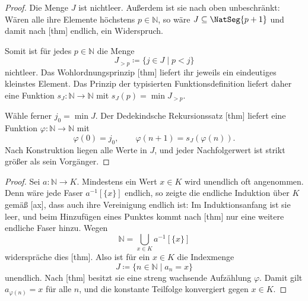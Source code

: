 \documentclass[main.tex]{subfiles}
\begin{document}
\begin{proof}
Die Menge \(J\) ist nichtleer. Außerdem ist sie nach oben unbeschränkt:
Wären alle ihre Elemente höchstens \(p\in\mathbb N\), so wäre
\(J\subseteq\NatSeg{p+1}\) und damit nach
[thm] endlich, ein Widerspruch.

Somit ist für jedes \(p\in\mathbb N\) die Menge
\[
 J_{>p}\coloneqq\{j\in J\mid p<j\}
\]
nichtleer. Das Wohlordnungsprinzip
[thm] liefert ihr jeweils ein
eindeutiges kleinstes Element. Das Prinzip der typisierten
Funktionsdefinition liefert daher eine Funktion
\(s_J\colon\mathbb N\to\mathbb N\) mit
\(s_J(p)=\min J_{>p}\).

Wähle ferner \(j_0=\min J\). Der Dedekindsche Rekursionssatz
[thm] liefert eine Funktion
\(\varphi\colon\mathbb N\to\mathbb N\) mit
\[
 \varphi(0)=j_0,
 \qquad
 \varphi(n+1)=s_J(\varphi(n)).
\]
Nach Konstruktion liegen alle Werte in \(J\), und jeder Nachfolgerwert ist
strikt größer als sein Vorgänger.
\end{proof}

\begin{proof}
Sei \(a\colon\mathbb N\to K\). Mindestens ein Wert \(x\in K\) wird
unendlich oft angenommen. Denn wäre jede Faser \(a^{-1}[\{x\}]\) endlich,
so zeigte die endliche Induktion über \(K\) gemäß
[ax], dass auch ihre Vereinigung
endlich ist: Im Induktionsanfang ist sie leer, und beim Hinzufügen eines
Punktes kommt nach [thm] nur eine weitere endliche
Faser hinzu. Wegen
\[
 \mathbb N=\bigcup_{x\in K}a^{-1}[\{x\}]
\]
widerspräche dies
[thm]. Also ist für ein \(x\in K\) die
Indexmenge
\[
 J\coloneqq\{n\in\mathbb N\mid a_n=x\}
\]
unendlich. Nach
[thm] besitzt sie
eine streng wachsende Aufzählung \(\varphi\). Damit gilt
\(a_{\varphi(n)}=x\) für alle \(n\), und die konstante Teilfolge konvergiert
gegen \(x\in K\).
\end{proof}
\end{document}
